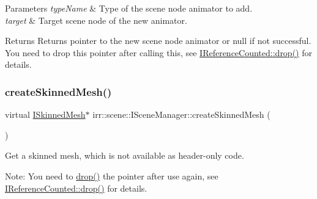 \begin{DoxyParams}{Parameters}
{\em type\+Name} & Type of the scene node animator to add. \\
\hline
{\em target} & Target scene node of the new animator. \\
\hline
\end{DoxyParams}
\begin{DoxyReturn}{Returns}
Returns pointer to the new scene node animator or null if not successful. You need to drop this pointer after calling this, see \hyperlink{classirr_1_1IReferenceCounted_a03856a09355b89d178090c4a5f738543}{I\+Reference\+Counted\+::drop()} for details. 
\end{DoxyReturn}
\mbox{\label{classirr_1_1scene_1_1ISceneManager_a67015b46ffde252ba723e6dcc6a93ac2}} 
\subsubsection{\texorpdfstring{create\+Skinned\+Mesh()}{createSkinnedMesh()}\hspace{0.1cm}{\footnotesize\ttfamily [1/2]}}
{\footnotesize\ttfamily virtual \hyperlink{classirr_1_1scene_1_1ISkinnedMesh}{I\+Skinned\+Mesh}$\ast$ irr\+::scene\+::\+I\+Scene\+Manager\+::create\+Skinned\+Mesh (\begin{DoxyParamCaption}{ }\end{DoxyParamCaption})\hspace{0.3cm}{\ttfamily [pure virtual]}}



Get a skinned mesh, which is not available as header-\/only code. 

Note\+: You need to \hyperlink{classirr_1_1IReferenceCounted_a03856a09355b89d178090c4a5f738543}{drop()} the pointer after use again, see \hyperlink{classirr_1_1IReferenceCounted_a03856a09355b89d178090c4a5f738543}{I\+Reference\+Counted\+::drop()} for details. \mbox{\label{classirr_1_1scene_1_1ISceneManager_a67015b46ffde252ba723e6dcc6a93ac2}} 

